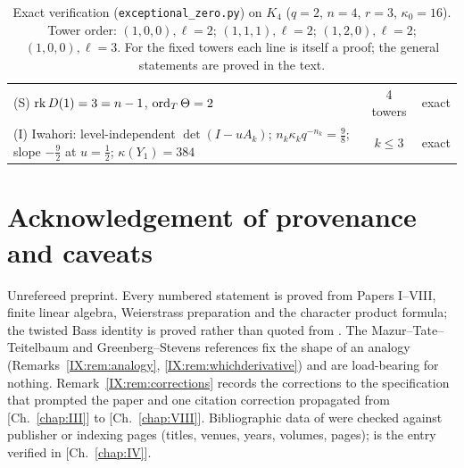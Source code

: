\begin{table}[ht]
\begin{tabular}{p{11.3cm}cl}
(S) $\operatorname{rk} D(1)=3=n-1$, $\operatorname{ord}_T\Theta=2$ & 4 towers & exact\\
(I) Iwahori: level-independent $\det(I-uA_k)$; $n_k\kappa_kq^{-n_k}=\frac98$; slope $-\frac92$ at $u=\frac12$; $\kappa(Y_1)=384$ & $k\le3$ & exact\\
\bottomrule
\end{tabular}
\medskip
\caption{Exact verification (\texttt{exceptional\_zero.py}) on $K_4$ ($q=2$, $n=4$,
$r=3$, $\kappa_0=16$). Tower order: $(1,0,0),\ell=2$; $(1,1,1),\ell=2$;
$(1,2,0),\ell=2$; $(1,0,0),\ell=3$. For the fixed towers each line is itself a proof;
the general statements are proved in the text.}
\label{IX:tab:battery}
\end{table}

\section*{Acknowledgement of provenance and caveats}

Unrefereed preprint. Every numbered statement is proved from Papers I--VIII, finite
linear algebra, Weierstrass preparation \cite{Wa} and the character product formula;
the twisted Bass identity is proved rather than quoted from \cite{ST}. The
Mazur--Tate--Teitelbaum and Greenberg--Stevens references \cite{MTT,GS} fix the shape of
an analogy (Remarks~\ref{IX:rem:analogy}, \ref{IX:rem:whichderivative}) and are load-bearing
for nothing. Remark~\ref{IX:rem:corrections} records the corrections to the specification
that prompted the paper and one citation correction propagated from [Ch.~\ref{chap:III}] to [Ch.~\ref{chap:VIII}].
Bibliographic data of \cite{MTT,GS,ST,Ba} were checked against publisher or indexing
pages (titles, venues, years, volumes, pages); \cite{Wa} is the entry verified in [Ch.~\ref{chap:IV}].
